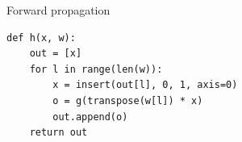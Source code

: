 \begin{frame}[fragile]
  \begin{block}{Forward propagation}
    \begin{lstlisting}
def h(x, w):
    out = [x]
    for l in range(len(w)):
        x = insert(out[l], 0, 1, axis=0)
        o = g(transpose(w[l]) * x)
        out.append(o)
    return out
  \end{lstlisting}
  \end{block}
\end{frame}

